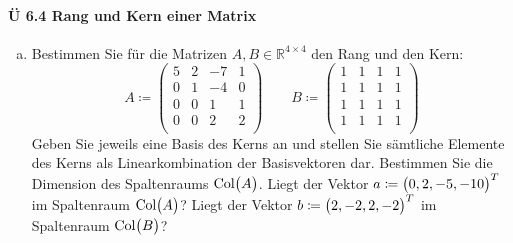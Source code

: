 \documentclass{scrreprt}
\begin{document}
\paragraph{Ü 6.4 Rang und Kern einer Matrix}
\begin{enumerate}[(a)]
\item Bestimmen Sie für die Matrizen $A, B \in \mathbb{R}^{4 \times 4}$ den Rang
  und den Kern:
  \[
    A \coloneqq \begin{pmatrix}
      5 & 2 & -7 & 1 \\
      0 & 1 & -4 & 0 \\
      0 & 0 & 1  & 1 \\
      0 & 0 & 2  & 2 \\
    \end{pmatrix}
    \qquad
    B \coloneqq \begin{pmatrix}
      1 & 1 & 1 & 1 \\
      1 & 1 & 1 & 1 \\
      1 & 1 & 1 & 1 \\
      1 & 1 & 1 & 1 \\
    \end{pmatrix}
  \]
  Geben Sie jeweils eine Basis des Kerns an und stellen Sie sämtliche Elemente
  des Kerns als Linearkombination der Basisvektoren dar.
  Bestimmen Sie die Dimension des Spaltenraums $\text{Col}\qty\big(A)$.
  Liegt der Vektor $a \coloneqq \qty\big(0, 2, -5, -10)^T$ im Spaltenraum
  $\text{Col}\qty\big(A)$?
  Liegt der Vektor $b \coloneqq \qty\big(2, -2, 2, -2)^T$ im Spaltenraum
  $\text{Col}\qty\big(B)$?


\end{enumerate}
\end{document}
